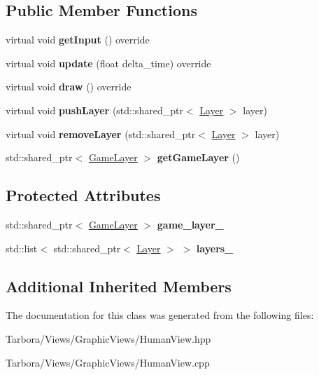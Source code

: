 \subsection*{Public Member Functions}
\begin{DoxyCompactItemize}
\item 
\mbox{\label{classTarbora_1_1HumanView_a75fa36692e1cb1b03cd2f29da3116030}} 
virtual void {\bfseries get\+Input} () override
\item 
\mbox{\label{classTarbora_1_1HumanView_a190976e6f3a985e3cd0c26e0b4fbce9e}} 
virtual void {\bfseries update} (float delta\+\_\+time) override
\item 
\mbox{\label{classTarbora_1_1HumanView_a5c4dc7d8991c74d5938541e3f20a9577}} 
virtual void {\bfseries draw} () override
\item 
\mbox{\label{classTarbora_1_1HumanView_a3a75c067960e76e0f93e38173207e1f9}} 
virtual void {\bfseries push\+Layer} (std\+::shared\+\_\+ptr$<$ \hyperlink{classTarbora_1_1Layer}{Layer} $>$ layer)
\item 
\mbox{\label{classTarbora_1_1HumanView_a99b7e8772da22b3fbc0838c2e60f0857}} 
virtual void {\bfseries remove\+Layer} (std\+::shared\+\_\+ptr$<$ \hyperlink{classTarbora_1_1Layer}{Layer} $>$ layer)
\item 
\mbox{\label{classTarbora_1_1HumanView_a98b69a9e17e670858771badd990a624a}} 
std\+::shared\+\_\+ptr$<$ \hyperlink{classTarbora_1_1GameLayer}{Game\+Layer} $>$ {\bfseries get\+Game\+Layer} ()
\end{DoxyCompactItemize}
\subsection*{Protected Attributes}
\begin{DoxyCompactItemize}
\item 
\mbox{\label{classTarbora_1_1HumanView_aebc7f790077b586e0e9d747e2f307725}} 
std\+::shared\+\_\+ptr$<$ \hyperlink{classTarbora_1_1GameLayer}{Game\+Layer} $>$ {\bfseries game\+\_\+layer\+\_\+}
\item 
\mbox{\label{classTarbora_1_1HumanView_a9d28c640bcd6df8871dd4afafed7837f}} 
std\+::list$<$ std\+::shared\+\_\+ptr$<$ \hyperlink{classTarbora_1_1Layer}{Layer} $>$ $>$ {\bfseries layers\+\_\+}
\end{DoxyCompactItemize}
\subsection*{Additional Inherited Members}


The documentation for this class was generated from the following files\+:\begin{DoxyCompactItemize}
\item 
Tarbora/\+Views/\+Graphic\+Views/Human\+View.\+hpp\item 
Tarbora/\+Views/\+Graphic\+Views/Human\+View.\+cpp\end{DoxyCompactItemize}
